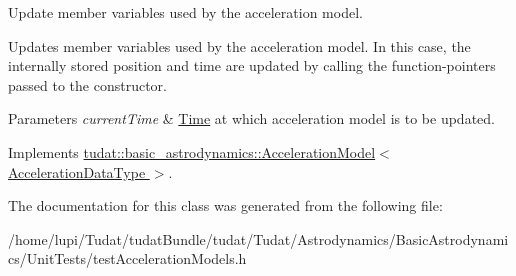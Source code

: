 Update member variables used by the acceleration model. 

Updates member variables used by the acceleration model. In this case, the internally stored position and time are updated by calling the function-\/pointers passed to the constructor. 
\begin{DoxyParams}{Parameters}
{\em current\+Time} & \hyperlink{classtudat_1_1Time}{Time} at which acceleration model is to be updated. \\
\hline
\end{DoxyParams}


Implements \hyperlink{classtudat_1_1basic__astrodynamics_1_1AccelerationModel_a966e85b72300b8cbc99ba60e40108d71}{tudat\+::basic\+\_\+astrodynamics\+::\+Acceleration\+Model$<$ Acceleration\+Data\+Type $>$}.



The documentation for this class was generated from the following file\+:\begin{DoxyCompactItemize}
\item 
/home/lupi/\+Tudat/tudat\+Bundle/tudat/\+Tudat/\+Astrodynamics/\+Basic\+Astrodynamics/\+Unit\+Tests/test\+Acceleration\+Models.\+h\end{DoxyCompactItemize}
